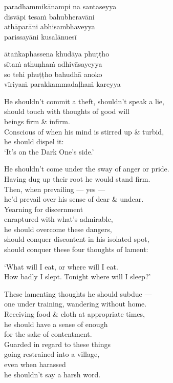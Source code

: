 \documentclass[
  babelLanguage=english,
  final,
  webversion,
]{chantingbook}
\newcommand{\verseref}[1]{\sidepar{#1}}
\begin{document}
\verseref{11}%
paradhammikānampi na santaseyya\\
disvāpi tesaṁ bahubheravāni\\
athāparāni abhisambhaveyya\\
parissayāni kusalānuesī

\verseref{12}%
ātaṅkaphassena khudāya phuṭṭho\\
sītaṁ athuṇhaṁ adhivāsayeyya\\
so tehi phuṭṭho bahudhā anoko\\
vīriyaṁ parakkammadaḷhaṁ kareyya

\clearpage

\englishText

He shouldn't commit a theft, shouldn't speak a lie,\\
should touch with thoughts of good will\\
\vin beings firm \& infirm.\\
Conscious of when his mind is stirred up \& turbid,\\
he should dispel it:\\
\vin `It's on the Dark One's side.'

He shouldn't come under the sway of anger or pride.\\
Having dug up their root he would stand firm.\\
Then, when prevailing — yes —\\
he'd prevail over his sense of dear \& undear.\\
Yearning for discernment\\
enraptured with what's admirable,\\
he should overcome these dangers,\\
should conquer discontent in his isolated spot,\\
should conquer these four thoughts of lament:

\vin `What will I eat, or where will I eat.\\
\vin How badly I slept. Tonight where will I sleep?'

These lamenting thoughts he should subdue —\\
one under training, wandering without home.\\
Receiving food \& cloth at appropriate times,\\
he should have a sense of enough\\
for the sake of contentment.\\
Guarded in regard to these things\\
going restrained into a village,\\
even when harassed\\
he shouldn't say a harsh word.
\end{document}

